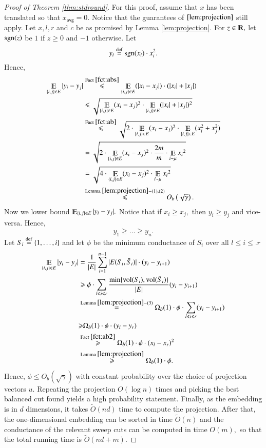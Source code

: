 \documentclass[twoside,leqno,twocolumn]{article}
\renewcommand{\mathbb}{\varmathbb}
\renewcommand{\leq}{\leqslant}
\renewcommand{\geq}{\geqslant}
\newcommand{\vol}{\mathrm{vol}}
\newcommand{\defeq}{\stackrel{\textup{def}}{=}}
\newcommand{\R}{\mathbb R}
\newcommand{\sgn}{{\rm sgn}}
\newcommand{\Esymb}{\mathbb{E}}
\DeclareMathOperator*{\E}{\Esymb}
\numberwithin{equation}{section}
\newcommand{\avg}{{\ensuremath{\mathsf{avg}}\xspace}}
\begin{document}
\begin{proof}[Proof of Theorem \ref{thm:stdround}]
For this proof, assume that $x$ has been translated so that $x_\avg = 0.$ Notice that the guarantees of $\ref{lem:projection}$ still apply.
Let $x, l, r$ and $c$ be as promised by Lemma \ref{lem:projection}. 
For $z \in \R,$ let $\sgn(z)$ be $1$ if $z \geq 0$ and $-1$ otherwise.
Let 
$$ y_i \defeq  \sgn (x_i) \cdot  x_i^2.$$
 Hence,
\begin{align*}
\E_{\{i,j\} \in E} |y_i - y_j| & \stackrel{\rm Fact \; \ref{fct:abs}}{\leq}  \E_{\{i,j\} \in E} (|x_i - x_j|)\cdot (|x_i|+|x_j|) \\
& \leq \sqrt{ \E_{\{i,j\} \in E} (x_i - x_j)^2\cdot \E_{\{i,j\} \in E} (|x_i|+|x_j|)^2} \\
& \stackrel{\rm Fact \;  \ref{fct:ab}}{\leq}   \sqrt{2\cdot  \E_{\{i,j\} \in E} (x_i - x_j)^2\cdot \E_{\{i,j\} \in E} (x_i^2+x_j^2)} \\
& =  \sqrt{2\cdot  \E_{\{i,j\} \in E} (x_i - x_j)^2\cdot \frac{2m}{m} \cdot \E_{i \sim \mu}{x_i}^2} \\
& =  \sqrt{4\cdot  \E_{\{i,j\} \in E} (x_i - x_j)^2\cdot \E_{i \sim \mu}{x_i}^2}  \\
&  \stackrel{{\rm Lemma \; \ref{lem:projection}-(1),(2)}}{\leq} O_b\left(\sqrt{\gamma}\right).  
\end{align*}
Now we lower bound $\E_{\{i,j\} \in E} |y_i - y_j|.$ Notice that if $x_i \geq x_j,$ then $y_i \geq y_j$ and vice-versa. Hence, 
$$y_1 \geq \ldots \geq y_n.$$
Let $S_i \defeq \{1,\ldots,i\}$  and let $\phi$ be the minimum conductance of $S_i$ over all $l \leq i \leq .r$   
\begin{align*}
\E_{\{i,j\} \in E} |y_i - y_j| &=  \frac{1}{|E|} \sum_{i=1}^{n-1} |E(S_i,\bar{S}_i)| \cdot (y_{i}-y_{i+1}) \\
& \geq  \phi  \cdot   \sum_{ l  \leq i \leq r}  \frac{\min \{ \vol(S_i), \vol (\bar{S}_i)\}}{|E|}(y_i-y_{i+1}) \\
& \stackrel{{\rm Lemma \; \ref{lem:projection}-(3)}}{=}  \Omega_b(1) \cdot \phi \cdot  \sum_{ l \leq i \leq r} (y_i-y_{i+1}) \\
& {\geq}  \Omega_b(1) \cdot   \phi \cdot (y_l - y_r) \\
& \stackrel{{\rm Fact \; \ref{fct:ab2}}}{\geq}   \Omega_b(1) \cdot \phi \cdot  (x_l - x_r)^2 \\
& \stackrel{{\rm Lemma \; \ref{lem:projection}}}{\geq}   \Omega_b(1) \cdot  \phi .
\end{align*}
Hence, $\phi \leq O_b(\sqrt{\gamma})$ with constant probability over the choice of projection vectors $u.$ Repeating the projection $O(\log n)$ times and picking the best balanced cut found yields a high probability statement. 
Finally, as the embedding is in $d$ dimensions, it takes $\tilde{O}(nd)$ time to compute the projection. After that, the one-dimensional embedding can be sorted in time $\tilde{O}(n)$ and the conductance of the relevant sweep cuts can be computed in time $O(m),$ so that the total running time is $\tilde{O}(nd + m).$
\end{proof}
\end{document}
